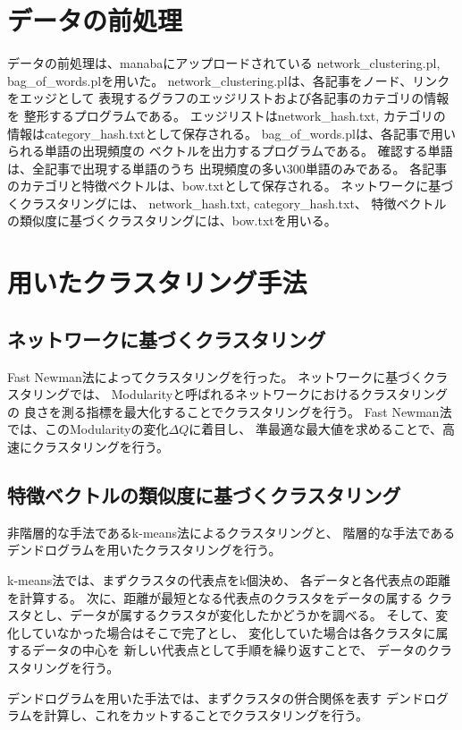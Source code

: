 \documentclass{jsarticle}
\begin{document}
\section{データの前処理}
データの前処理は、manabaにアップロードされている
network\_clustering.pl, bag\_of\_words.plを用いた。
network\_clustering.plは、各記事をノード、リンクをエッジとして
表現するグラフのエッジリストおよび各記事のカテゴリの情報を
整形するプログラムである。
エッジリストはnetwork\_hash.txt,
カテゴリの情報はcategory\_hash.txtとして保存される。
bag\_of\_words.plは、各記事で用いられる単語の出現頻度の
ベクトルを出力するプログラムである。
確認する単語は、全記事で出現する単語のうち
出現頻度の多い300単語のみである。
各記事のカテゴリと特徴ベクトルは、bow.txtとして保存される。
ネットワークに基づくクラスタリングには、
network\_hash.txt, category\_hash.txt、
特徴ベクトルの類似度に基づくクラスタリングには、bow.txtを用いる。

\section{用いたクラスタリング手法}
\subsection{ネットワークに基づくクラスタリング}
Fast Newman法によってクラスタリングを行った。
ネットワークに基づくクラスタリングでは、
Modularityと呼ばれるネットワークにおけるクラスタリングの
良さを測る指標を最大化することでクラスタリングを行う。
Fast Newman法では、このModularityの変化$\Delta Q$に着目し、
準最適な最大値を求めることで、高速にクラスタリングを行う。

\subsection{特徴ベクトルの類似度に基づくクラスタリング}
非階層的な手法であるk-means法によるクラスタリングと、
階層的な手法であるデンドログラムを用いたクラスタリングを行う。

k-means法では、まずクラスタの代表点をk個決め、
各データと各代表点の距離を計算する。
次に、距離が最短となる代表点のクラスタをデータの属する
クラスタとし、データが属するクラスタが変化したかどうかを調べる。
そして、変化していなかった場合はそこで完了とし、
変化していた場合は各クラスタに属するデータの中心を
新しい代表点として手順を繰り返すことで、
データのクラスタリングを行う。

デンドログラムを用いた手法では、まずクラスタの併合関係を表す
デンドログラムを計算し、これをカットすることでクラスタリングを行う。
\end{document}
